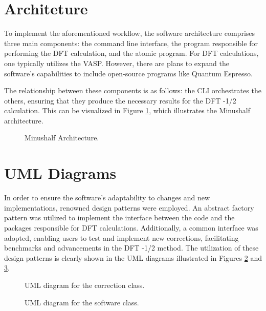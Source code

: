 \section{Architeture}
To implement the aforementioned workflow, the software architecture comprises three main components: the command line interface, the program responsible for performing the DFT calculation, and the atomic program. For DFT calculations, one typically utilizes the VASP. However, there are plans to expand the software's capabilities to include open-source programs like Quantum Espresso. 

The relationship between these components is as follows: the CLI orchestrates the others, ensuring that they produce the necessary results for the DFT -1/2 calculation. This can be visualized in Figure \ref{min-arch}, which illustrates the Minushalf architecture.
\begin{figure}[!ht]
        \centering
        
        \caption{Minushalf Architecture.}
        \label{min-arch}
\end{figure}

\section{UML Diagrams}
In order to ensure the software's adaptability to changes and new implementations, renowned design patterns were employed. An abstract factory pattern was utilized to implement the interface between the code and the packages responsible for DFT calculations. Additionally, a common interface was adopted, enabling users to test and implement new corrections, facilitating benchmarks and advancements in the DFT -1/2 method. The utilization of these design patterns is clearly shown in the UML diagrams illustrated in Figures \ref{img::cor} and \ref{img::fac}.
\begin{figure}[!ht]
        \centering
        
        \caption{UML diagram for the correction class.}
        \label{img::cor}
\end{figure}

\begin{figure}[!ht]
        \centering
        
        \caption{UML diagram for the software class.}
        \label{img::fac}
\end{figure}
